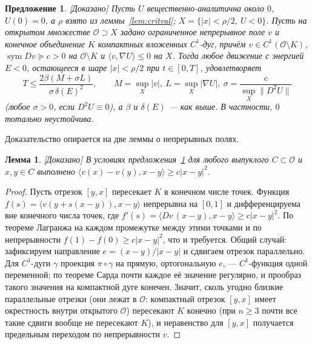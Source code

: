 \documentclass[11pt,a4paper]{article}
\newtheorem{lemma}[theorem]{Лемма}
\newtheorem{proposition}[theorem]{Предложение}
\theoremstyle{definition}
\newcommand{\sym}{\operatorname{sym}}
\newcommand{\mk}[1]{\textsf{[#1]}}
\begin{document}
\begin{proposition}\label{prop:palamodov-variant}
\mk{Доказано} Пусть $U$ вещественно-аналитична около $0$, $U(0)=0$, а $\rho$ взято из
леммы~\ref{lem:critval}; $X=\{|x|<\rho/2,\ U<0\}$. Пусть на открытом множестве $\mathcal O\supset X$
задано ограниченное непрерывное поле $v$ и конечное объединение $K$ компактных вложенных
$C^1$-дуг, причём
$v\in C^1(\mathcal O\setminus K)$, $\sym Dv\succeq c>0$ на $\mathcal O\setminus K$ и
$\langle v,\nabla U\rangle\le0$ на $X$. Тогда любое движение с энергией $E<0$, остающееся в шаре
$|x|<\rho/2$ при $t\in[0,T]$, удовлетворяет
\[
T\le\frac{2\beta(M+\sigma L)}{\sigma\,\delta(E)^2},\qquad M=\sup_X|v|,\ L=\sup_X|\nabla U|,\
\sigma=\frac{c}{\sup_X\lVert D^2U\rVert}
\]
(любое $\sigma>0$, если $D^2U\equiv0$), а $\beta$ и $\delta(E)$ --- как выше. В частности, $0$
тотально неустойчива.
\end{proposition}

Доказательство опирается на две леммы о непрерывных полях.

\begin{lemma}\label{lem:monotone}
\mk{Доказано} В условиях предложения~\ref{prop:palamodov-variant} для любого выпуклого
$C\subset\mathcal O$ и $x,y\in C$ выполнено $\langle v(x)-v(y),x-y\rangle\ge c|x-y|^2$.
\end{lemma}
\begin{proof}
Пусть отрезок $[y,x]$ пересекает $K$ в конечном числе точек. Функция
$f(s)=\langle v(y+s(x-y)),x-y\rangle$ непрерывна на $[0,1]$ и дифференцируема вне конечного числа
точек, где $f'(s)=\langle Dv\,(x-y),x-y\rangle\ge c|x-y|^2$. По теореме Лагранжа на каждом
промежутке между этими точками и по непрерывности $f(1)-f(0)\ge c|x-y|^2$, что и требуется.
Общий случай: зафиксируем направление $e=(x-y)/|x-y|$ и сдвигаем отрезок параллельно. Для
$C^1$-дуги $\gamma$ проекция $\pi\circ\gamma$ на прямую, ортогональную $e$, --- $C^1$-функция
одной переменной; по теореме Сарда почти каждое её значение регулярно, и прообраз такого
значения на компактной дуге конечен. Значит, сколь угодно близкие параллельные отрезки (они лежат в $\mathcal O$: компактный отрезок
$[y,x]$ имеет окрестность внутри открытого $\mathcal O$) пересекают $K$
конечно (при $n\ge3$ почти все такие сдвиги вообще не пересекают $K$), и неравенство для
$[y,x]$ получается предельным переходом по непрерывности $v$.
\end{proof}
\end{document}
